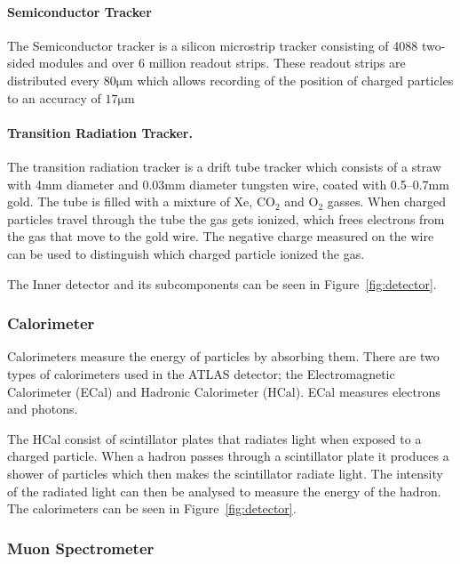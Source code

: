 \documentclass[12pt,a4paper]{article}
\numberwithin{equation}{section}
\begin{document}
\paragraph{Semiconductor Tracker}
The Semiconductor tracker is a silicon microstrip tracker consisting of 4088
two-sided modules and over 6 million readout strips. These readout strips are
distributed every $80\mathrm{\mu m}$ which allows recording of the position of
charged particles to an accuracy of $17\mathrm{\mu m}$

\paragraph{Transition Radiation Tracker.}
The transition radiation tracker is a drift tube tracker which consists of a
straw with 4mm diameter and 0.03mm diameter tungsten wire, coated with 0.5--0.7mm
gold. The tube is filled with a mixture of Xe, $\mathrm{CO_2}$ and
$\mathrm{O_2}$ gasses. When charged particles travel through the tube the gas
gets ionized, which frees electrons from the gas that move to the gold wire. The
negative charge measured on the wire can be used to distinguish which charged
particle ionized the gas. \cite{ATLAS-ID}

The Inner detector and its subcomponents can be seen in Figure~\ref{fig:detector}.


\subsubsection{Calorimeter}
Calorimeters measure the energy of particles by absorbing them. There are two
types of calorimeters used in the ATLAS detector; the Electromagnetic
Calorimeter (ECal) and Hadronic Calorimeter (HCal). ECal measures electrons and photons. 


The HCal consist of scintillator plates that radiates light when exposed to a
charged particle. When a hadron passes through a scintillator plate it produces
a shower of particles which then makes the scintillator radiate light. The
intensity of the radiated light can then be analysed to measure the energy of
the hadron. The calorimeters can be seen in Figure~\ref{fig:detector}. \cite{detector-vid}


\subsubsection{Muon Spectrometer}
\end{document}
